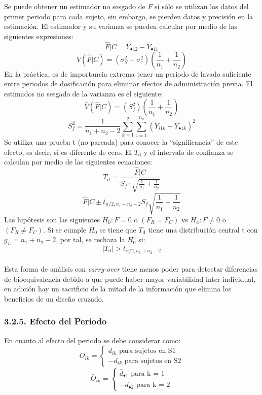 \documentclass[]{article}
\begin{document}
Se puede obtener un estimador no sesgado de \(F\) si sólo se utilizan
los datos del primer periodo para cada sujeto, sin embargo, se pierden
datos y precisión en la estimación. El estimador y su varianza se pueden
calcular por medio de las siguientes expresiones:\\
\[\hat{F}|C = \bar{Y}_{\bullet12} - \bar{Y}_{\bullet11}\]
\[V(\hat{F}|C) = (\sigma_{S}^{2}+\sigma_{e}^{2})\left (\frac{1}{n_{1}}+\frac{1}{n_{2}}\right)\]
En la práctica, es de importancia extrema tener un periodo de lavado
suficiente entre periodos de dosificación para eliminar efectos de
administración previa. El estimados no sesgado de la varianza es el
siguiente:\\
\[\hat{V}(\hat{F}|C) = (S_{f}^{2})\left (\frac{1}{n_{1}}+\frac{1}{n_{2}}\right)\]
\[S_{f}^{2} = \frac{1}{n_{1}+n_{2}-2} \sum_{k=1}^{2}\sum_{i=1}^{n_{k}}{\left ( Y_{i1k} - \bar{Y}_{\bullet1k}\right )^{2}}\]
Se utiliza una prueba t (no pareada) para conocer la ``significancia''
de este efecto, es decir, si es diferente de cero. El \(T_{\textrm{d}}\)
y el intervalo de confianza se calculan por medio de las siguientes
ecuaciones:\\
\[T_{\textrm{d}} = \frac{\hat{F}|C}{S_{f}\cdot\sqrt{\frac{1}{n_{1}}+\frac{1}{n_{2}}}}\]
\[\hat{F}|C \pm t_{\alpha/2, n_{1}+n_{2}-2} S_{f} \sqrt{\frac{1}{n_{1}}+\frac{1}{n_{2}}}\]
Las hipótesis son las siguientes \(H_{0}: F=0\) o \((F_{R} = F_{C})\) vs
\(H_{a}: F \neq 0\) o \((F_{R} \neq F_{C})\). Si se cumple \(H_{0}\) se
tiene que \(T_{\textrm{d}}\) tiene una distribución central t con
\(g_{L} = n_{1}+n_{2}-2\), por tal, se rechaza la \(H_{0}\) si:\\
\[\left |T_{\textrm{d}} \right | > t_{\alpha/2,n_{1}+n_{2}-2}\]\\
Esta forma de análisis con \emph{carry-over} tiene menos poder para
detectar diferencias de bioequivalencia debido a que puede haber mayor
variabilidad inter-individual, en adición hay un sacrificio de la mitad
de la información que elimina los beneficios de un diseño cruzado.

\subsubsection{3.2.5. Efecto del Periodo}\label{efecto-del-periodo}

En cuanto al efecto del periodo se debe considerar como:\\
\[O_{ik} = \left\{\begin{matrix} d_{ik} \textrm{ para sujetos en S1}\\ -d_{ik}\textrm{ para sujetos en S2} \end{matrix}\right.\]
\[\bar{O}_{ik} = \left\{\begin{matrix} \bar{d}_{\bullet1} \textrm{ para k = 1}\\ -\bar{d}_{\bullet2}\textrm{ para k = 2} \end{matrix}\right.\]
\end{document}
